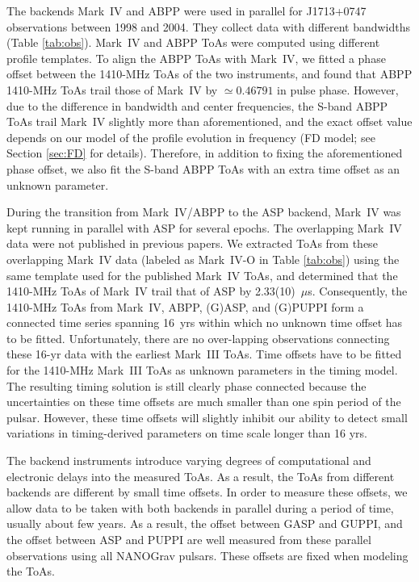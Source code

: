 The backends Mark~IV and ABPP were used in parallel for J1713+0747 
observations between 1998 and 2004. They collect data with different
bandwidths (Table \ref{tab:obs}). Mark~IV and ABPP ToAs were computed using different
profile templates.
To align the ABPP ToAs with Mark~IV, we
fitted a phase offset between the 1410-MHz ToAs of the two instruments, and found
that ABPP 1410-MHz ToAs trail those of Mark~IV by $\simeq0.46791$ 
in pulse phase.
However, due to the difference in bandwidth and center frequencies, the S-band
ABPP ToAs trail Mark~IV slightly more than aforementioned, and the exact
offset value depends on our model of the profile evolution in frequency (FD
model; see Section \ref{sec:FD} for details). Therefore, in
addition to fixing the aforementioned phase offset, we also 
fit the S-band ABPP ToAs with an extra time offset as an unknown parameter.

During the transition from Mark~IV/ABPP to the ASP backend, Mark~IV
was kept running in parallel with ASP for several epochs. 
The overlapping Mark~IV data were not published in previous papers. 
We extracted ToAs from these overlapping Mark~IV data (labeled as Mark~IV-O in Table \ref{tab:obs})
using the same template used for the published Mark~IV ToAs,
and determined that the 1410-MHz ToAs of Mark~IV trail that of ASP by
2.33(10)~$\mu$s. Consequently, the
1410-MHz ToAs from Mark~IV, ABPP, (G)ASP, and (G)PUPPI form a connected time
series spanning 16~yrs within which no unknown time offset has to be fitted. 
Unfortunately, there are no
over-lapping observations connecting these 16-yr data with the earliest  Mark~III ToAs. 
Time offsets have to be
fitted for the 1410-MHz Mark~III ToAs as unknown parameters in the timing
model. The resulting timing solution is still
clearly phase connected because the uncertainties on these time offsets are
much
smaller than one spin period of the pulsar. However, these time offsets will
slightly inhibit our ability to detect small variations in timing-derived
parameters on time scale longer than 16 yrs.

The backend instruments introduce varying degrees of computational
and electronic delays into the measured ToAs. 
As a result, the ToAs from different backends are different by small time
offsets.
In order to measure these offsets, we allow data to be taken 
with both backends in parallel during a period of time, usually about few years.
As a result, the offset between GASP and GUPPI, and the offset between ASP and
PUPPI are well measured from these parallel observations using all NANOGrav
pulsars. These offsets are fixed when modeling the ToAs. 




